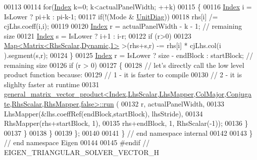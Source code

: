 \begin{DoxyCode}
00113 
00114       \textcolor{keywordflow}{for}(\hyperlink{namespace_eigen_a62e77e0933482dafde8fe197d9a2cfde}{Index} k=0; k<actualPanelWidth; ++k)
00115       \{
00116         \hyperlink{namespace_eigen_a62e77e0933482dafde8fe197d9a2cfde}{Index} i = IsLower ? pi+k : pi-k-1;
00117         \textcolor{keywordflow}{if}(!(Mode & \hyperlink{group__enums_gga39e3366ff5554d731e7dc8bb642f83cdaddb72f888ac85d5a1c52333e54f9374b}{UnitDiag}))
00118           rhs[i] /= cjLhs.coeff(i,i);
00119 
00120         \hyperlink{namespace_eigen_a62e77e0933482dafde8fe197d9a2cfde}{Index} r = actualPanelWidth - k - 1; \textcolor{comment}{// remaining size}
00121         \hyperlink{namespace_eigen_a62e77e0933482dafde8fe197d9a2cfde}{Index} s = IsLower ? i+1 : i-r;
00122         \textcolor{keywordflow}{if} (r>0)
00123           \hyperlink{group___core___module_class_eigen_1_1_map}{Map<Matrix<RhsScalar,Dynamic,1>} >(rhs+s,r) -= rhs[i] * cjLhs.col(i
      ).segment(s,r);
00124       \}
00125       \hyperlink{namespace_eigen_a62e77e0933482dafde8fe197d9a2cfde}{Index} r = IsLower ? size - endBlock : startBlock; \textcolor{comment}{// remaining size}
00126       \textcolor{keywordflow}{if} (r > 0)
00127       \{
00128         \textcolor{comment}{// let's directly call the low level product function because:}
00129         \textcolor{comment}{// 1 - it is faster to compile}
00130         \textcolor{comment}{// 2 - it is slighlty faster at runtime}
00131         
      \hyperlink{struct_eigen_1_1internal_1_1general__matrix__vector__product}{general\_matrix\_vector\_product<Index,LhsScalar,LhsMapper,ColMajor,Conjugate,RhsScalar,RhsMapper,false>::run}
      (
00132             r, actualPanelWidth,
00133             LhsMapper(&lhs.coeffRef(endBlock,startBlock), lhsStride),
00134             RhsMapper(rhs+startBlock, 1),
00135             rhs+endBlock, 1, RhsScalar(-1));
00136       \}
00137     \}
00138   \}
00139 \};
00140 
00141 \} \textcolor{comment}{// end namespace internal}
00142 
00143 \} \textcolor{comment}{// end namespace Eigen}
00144 
00145 \textcolor{preprocessor}{#endif // EIGEN\_TRIANGULAR\_SOLVER\_VECTOR\_H}
\end{DoxyCode}
